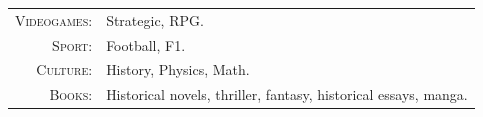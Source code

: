 \begin{tabular}{rl}
	\textsc{Videogames:} & Strategic, RPG. \\
	\textsc{Sport:} & Football, F1. \\
	\textsc{Culture:} & History, Physics, Math. \\
	\textsc{Books:} & Historical novels, thriller, fantasy, historical essays, manga. \\
\end{tabular}
